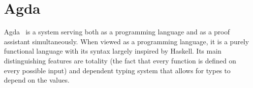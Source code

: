 \usepackage{amstext}
\usepackage{amssymb}
\usepackage{stmaryrd}


\newcommand{\redFG}[1]{\textcolor[rgb]{0.6,0,0}{#1}}
\newcommand{\greenFG}[1]{\textcolor[rgb]{0,0.4,0}{#1}}
\newcommand{\blueFG}[1]{\textcolor[rgb]{0,0,0.8}{#1}}
\newcommand{\orangeFG}[1]{\textcolor[rgb]{0.8,0.4,0}{#1}}
\newcommand{\purpleFG}[1]{\textcolor[rgb]{0.4,0,0.4}{#1}}
\newcommand{\yellowFG}[1]{\textcolor{yellow}{#1}}
\newcommand{\brownFG}[1]{\textcolor[rgb]{0.5,0.2,0.2}{#1}}
\newcommand{\blackFG}[1]{\textcolor[rgb]{0,0,0}{#1}}
\newcommand{\whiteFG}[1]{\textcolor[rgb]{1,1,1}{#1}}
\newcommand{\yellowBG}[1]{\colorbox[rgb]{1,1,0.2}{#1}}
\newcommand{\brownBG}[1]{\colorbox[rgb]{1.0,0.7,0.4}{#1}}

\newcommand{\ColourStuff}{
  \newcommand{\red}{\redFG}
  \newcommand{\green}{\greenFG}
  \newcommand{\blue}{\blueFG}
  \newcommand{\orange}{\orangeFG}
  \newcommand{\purple}{\purpleFG}
  \newcommand{\yellow}{\yellowFG}
  \newcommand{\brown}{\brownFG}
  \newcommand{\black}{\blackFG}
  \newcommand{\white}{\whiteFG}
}

\newcommand{\MonochromeStuff}{
  \newcommand{\red}{\blackFG}
  \newcommand{\green}{\blackFG}
  \newcommand{\blue}{\blackFG}
  \newcommand{\orange}{\blackFG}
  \newcommand{\purple}{\blackFG}
  \newcommand{\yellow}{\blackFG}
  \newcommand{\brown}{\blackFG}
  \newcommand{\black}{\blackFG}
  \newcommand{\white}{\blackFG}
}

\MonochromeStuff

\newcommand{\K}[1]{\yellow{\mathsf{#1}}}
\newcommand{\Q}[1]{\green{\mathsf{#1}}}
\newcommand{\D}[1]{\blue{\mathsf{#1}}}
\newcommand{\C}[1]{\red{\mathsf{#1}}}
\newcommand{\F}[1]{\green{\mathsf{#1}}}
\newcommand{\V}[1]{\purple{\mathit{#1}}}

\newcommand{\dfeq}{\overset{\mathrm{df}}{=}}


\section{Agda\label{sec:Agda-background}}

Agda~\cite{norell:thesis} is a system serving both as a programming language and as a proof assistant simultaneously.
When viewed as a programming language, it is a purely functional language with its syntax largely inspired by 
Haskell. Its main distinguishing features are totality (the fact that every function is defined 
on every possible input) and dependent typing system that allows for types to depend on the values.

